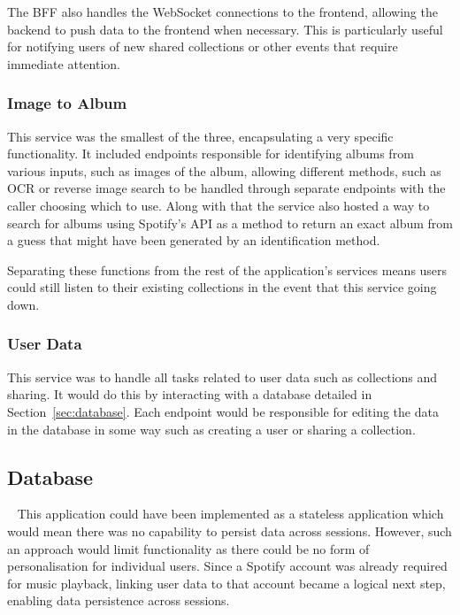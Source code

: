 The BFF also handles the WebSocket connections to the frontend, allowing the backend to push data to the frontend when necessary. This is particularly useful for notifying users of new shared collections or other events that require immediate attention.

\subsubsection{Image to Album}
This service was the smallest of the three, encapsulating a very specific functionality. It included endpoints responsible for identifying albums from various inputs, such as images of the album, allowing different methods, such as OCR or reverse image search to be handled through separate endpoints with the caller choosing which to use. Along with that the service also hosted a way to search for albums using Spotify's API as a method to return an exact album from a guess that might have been generated by an identification method.

Separating these functions from the rest of the application’s services means users could still listen to their existing collections in the event that this service going down.

\subsubsection{User Data}
This service was to handle all tasks related to user data such as collections and sharing. It would do this by interacting with a database detailed in Section~\ref{sec:database}. Each endpoint would be responsible for editing the data in the database in some way such as creating a user or sharing a collection.

\subsection{Database}~\label{sec:database}
This application could have been implemented as a stateless application which would  mean there was no capability to persist data across sessions. However, such an approach would limit functionality as there could be no form of personalisation for individual users. Since a Spotify account was already required for music playback, linking user data to that account became a logical next step, enabling data persistence across sessions.

